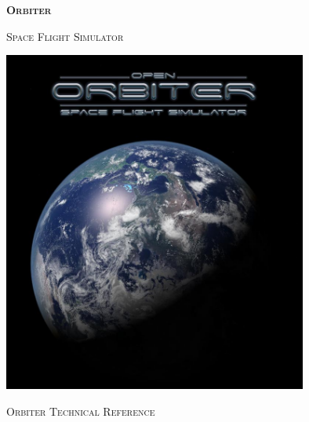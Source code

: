 


\graphicspath{{Images//}}



\renewcommand*\familydefault{\sfdefault}
\sffamily

\pagestyle{fancy}
\renewcommand{\footrulewidth}{0.4pt}


\lhead{}
\chead{}
\rhead{}
\cfoot{\thepage}


\titleformat{\paragraph}[hang]{\bfseries}{\theparagraph}{1em}{}





\begin{titlepage}
\begin{center}


\textsc{\fontsize{60}{60} \textbf{Orbiter}}\\
\vspace{0.5cm}

\textsc{\Huge Space Flight Simulator}\\
\vspace{2.0cm}

\includegraphics[width=0.75\textwidth]{..//orbiterlogo.png}
\vspace{2.0cm}

\textsc{\LARGE Orbiter Technical Reference}

\end{center}
\end{titlepage}


\newpage
{}

\tableofcontents
\newpage


\newpage

\newpage

\newpage

\newpage

\newpage

\newpage

\newpage

\newpage

\newpage

\newpage

\newpage


